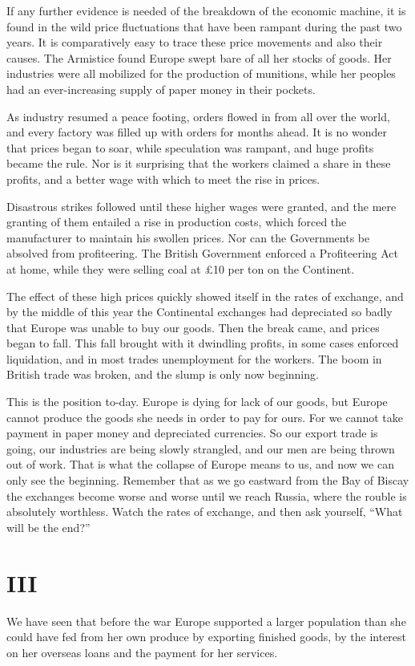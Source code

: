 \documentclass{book}
\begin{document}
If any further evidence is needed of the breakdown of the economic machine, it is found in the wild price fluctuations that have been rampant during the past two years. It is comparatively easy to trace these price movements and also their causes. The Armistice found Europe swept bare of all her stocks of goods. Her industries were all mobilized for the production of munitions, while her peoples had an ever-increasing supply of paper money in their pockets.

As industry resumed a peace footing, orders flowed in from all over the world, and every factory was filled up with orders for months ahead. It is no wonder that prices began to soar, while speculation was rampant, and huge profits became the rule. Nor is it surprising that the workers claimed a share in these profits, and a better wage with which to meet the rise in prices.

Disastrous strikes followed until these higher wages were granted, and the mere granting of them entailed a rise in production costs, which forced the manufacturer to maintain his swollen prices. Nor can the Governments be absolved from profiteering. The British Government enforced a Profiteering Act at home, while they were selling coal at £10 per ton on the Continent.

The effect of these high prices quickly showed itself in the rates of exchange, and by the middle of this year the Continental exchanges had depreciated so badly that Europe was unable to buy our goods. Then the break came, and prices began to fall. This fall brought with it dwindling profits, in some cases enforced liquidation, and in most trades unemployment for the workers. The boom in British trade was broken, and the slump is only now beginning.

This is the position to-day. Europe is dying for lack of our goods, but Europe cannot produce the goods she needs in order to pay for ours. For we cannot take payment in paper money and depreciated currencies. So our export trade is going, our industries are being slowly strangled, and our men are being thrown out of work. That is what the collapse of Europe means to us, and now we can only see the beginning. Remember that as we go eastward from the Bay of Biscay the exchanges become worse and worse until we reach Russia, where the rouble is absolutely worthless. Watch the rates of exchange, and then ask yourself, “What will be the end?”

\section*{III}
We have seen that before the war Europe supported a larger population than she could have fed from her own produce by exporting finished goods, by the interest on her overseas loans and the payment for her services.
\end{document}

